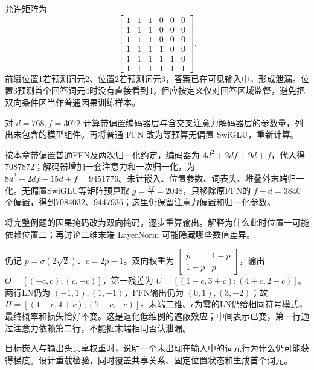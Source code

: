\begin{exercises}
\begin{exercise}
\begin{solution}
允许矩阵为
\[
\begin{bmatrix}1&1&1&0&0&0\\1&1&1&0&0&0\\1&1&1&0&0&0\\1&1&1&1&0&0\\1&1&1&1&1&0\\1&1&1&1&1&1\end{bmatrix}.
\]
前缀位置1若预测词元2、位置2若预测词元3，答案已在可见输入中，形成泄漏。位置3预测首个回答词元4时没有直接看到4，但应按定义仅对回答区域监督，避免把双向条件区当作普通因果训练样本。
\end{solution}
\end{exercise}

\begin{exercise}\optional 对 $d=768,f=3072$ 计算带偏置编码器层与含交叉注意力解码器层的参数量，列出未包含的模型组件。再将普通 FFN 改为等预算无偏置 SwiGLU，重新计算。

\begin{solution}
按本章带偏置普通FFN及两次归一化约定，编码器为 $4d^2+2df+9d+f$，代入得7087872；解码器增加一套注意力和一次归一化，为 $8d^2+2df+15d+f=9451776$。未计嵌入、位置参数、词表头、堆叠外末端归一化。无偏置SwiGLU等矩阵预算取 $g=\frac{2f}{3}=2048$，只移除原FFN的 $f+d=3840$ 个偏置，得到7084032、9447936；这里仍保留注意力偏置和归一化参数。
\end{solution}
\end{exercise}

\begin{exercise}\optional 将完整例题的因果掩码改为双向掩码，逐步重算输出。解释为什么此时位置一可能依赖位置二；再讨论二维末端 LayerNorm 可能隐藏哪些数值差异。

\begin{solution}
仍记 $p=\sigma(2\sqrt2)$、$c=2p-1$。双向权重为 $\left[\begin{smallmatrix}p&1-p\\1-p&p\end{smallmatrix}\right]$，输出 $O=[(-c,c);(c,-c)]$，第一残差为 $U=[(1-c,3+c);(4+c,2-c)]$。两行LN仍为 $(-1,1),(1,-1)$，FFN输出仍为 $(0,1),(3,-2)$；故 $H=[(1-c,4+c);(7+c,-c)]$。末端二维、$\epsilon$为零的LN仍给相同符号模式，最终概率和损失恰好不变。这是退化低维例的遮蔽效应；中间表示已变，第一行通过注意力依赖第二行，不能据末端相同否认泄漏。
\end{solution}
\end{exercise}

\begin{exercise} 目标嵌入与输出头共享权重时，说明一个未出现在输入中的词元行为什么仍可能获得梯度。设计重载检验，同时覆盖共享关系、固定位置状态和生成首个词元。


\end{exercise}
\end{exercises}
